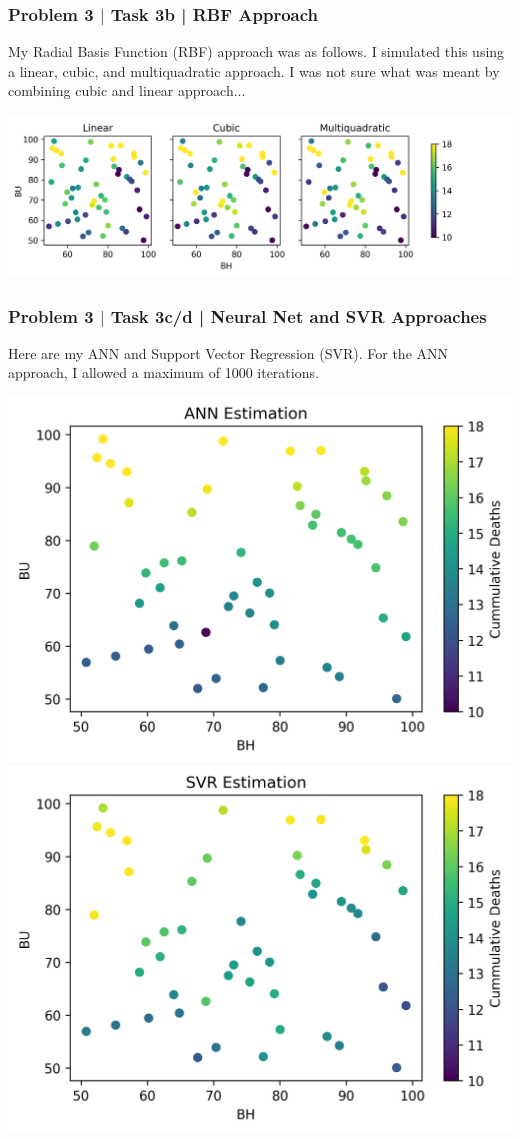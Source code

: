 \documentclass[aspectratio=1610]{beamer}
\begin{document}
\begin{frame}
\frametitle{Problem 3 $|$ Task 3b | RBF Approach}

My Radial Basis Function (RBF) approach was as follows. I simulated this using a linear, cubic, and multiquadratic approach. I was not sure what was meant by combining cubic and linear approach...


\vspace{1em}

\centering
\includegraphics[width = .99\textwidth]{RBF}

\end{frame}

\begin{frame}
\frametitle{Problem 3 $|$ Task 3c/d | Neural Net and SVR Approaches}

Here are my ANN and Support Vector Regression (SVR). For the ANN approach, I allowed a maximum of 1000 iterations.

\vspace{1em}

\centering
\includegraphics[width = .45\textwidth]{ANN}
\includegraphics[width = .45\textwidth]{SVR}
\end{frame}
\end{document}
